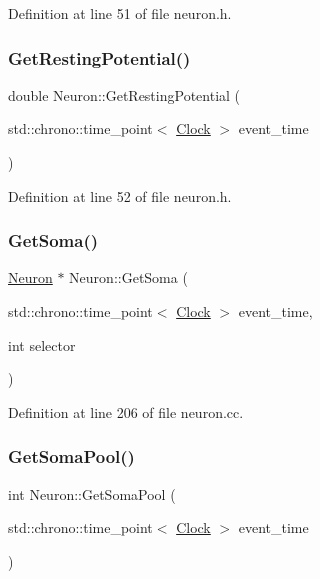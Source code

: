 Definition at line 51 of file neuron.\+h.

\mbox{\label{class_neuron_a0573244d3c78a22a45c249db536cbb68}} 
\subsubsection{\texorpdfstring{Get\+Resting\+Potential()}{GetRestingPotential()}}
{\footnotesize\ttfamily double Neuron\+::\+Get\+Resting\+Potential (\begin{DoxyParamCaption}\item[{std\+::chrono\+::time\+\_\+point$<$ \mbox{\hyperlink{universe_8h_a0ef8d951d1ca5ab3cfaf7ab4c7a6fd80}{Clock}} $>$}]{event\+\_\+time }\end{DoxyParamCaption})\hspace{0.3cm}{\ttfamily [inline]}}



Definition at line 52 of file neuron.\+h.

\mbox{\label{class_neuron_a8539a7965349078a7b1c1265895daefa}} 
\subsubsection{\texorpdfstring{Get\+Soma()}{GetSoma()}}
{\footnotesize\ttfamily \mbox{\hyperlink{class_neuron}{Neuron}} $\ast$ Neuron\+::\+Get\+Soma (\begin{DoxyParamCaption}\item[{std\+::chrono\+::time\+\_\+point$<$ \mbox{\hyperlink{universe_8h_a0ef8d951d1ca5ab3cfaf7ab4c7a6fd80}{Clock}} $>$}]{event\+\_\+time,  }\item[{int}]{selector }\end{DoxyParamCaption})}



Definition at line 206 of file neuron.\+cc.

\mbox{\label{class_neuron_aa6f1237ed89c48eb57610083edf43efa}} 
\subsubsection{\texorpdfstring{Get\+Soma\+Pool()}{GetSomaPool()}}
{\footnotesize\ttfamily int Neuron\+::\+Get\+Soma\+Pool (\begin{DoxyParamCaption}\item[{std\+::chrono\+::time\+\_\+point$<$ \mbox{\hyperlink{universe_8h_a0ef8d951d1ca5ab3cfaf7ab4c7a6fd80}{Clock}} $>$}]{event\+\_\+time }\end{DoxyParamCaption})\hspace{0.3cm}{\ttfamily [inline]}}



